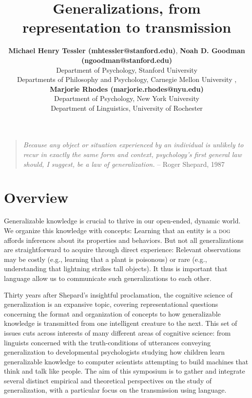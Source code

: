 \documentclass[10pt,letterpaper]{article}
\title{Generalizations, from representation to transmission}
\author{{\large \bf Michael Henry Tessler (mhtessler@stanford.edu)}, {\large \bf Noah D. Goodman (ngoodman@stanford.edu)}  \\
  Department of Psychology, Stanford University \vspace{-0.1cm}
   \AND {\large \bf David Danks (ddanks@cmu.edu)} \\
  Departments of Philosophy and Psychology, Carnegie Mellon University \vspace{-0.1cm}
    \AND{\large \bf Emily Foster-Hanson (emily.fosterhanson@nyu.edu)}, {\large \bf Marjorie Rhodes (marjorie.rhodes@nyu.edu)} \\
  Department of Psychology, New York University \vspace{-0.1cm}
    \AND {\large \bf Gregory Carlson (calrson@ling.rochester.edu)} \\
  Department of Linguistics, University of Rochester \vspace{-0.1cm}
  }
\begin{document}
\maketitle



\begin{quote}
\footnotesize
\emph{Because any object or situation experienced by an individual is unlikely to recur in exactly the same form and context, psychology's first general law should, I suggest, be a law of generalization.}  -- Roger Shepard, 1987
\end{quote}
\section{Overview}

Generalizable knowledge is crucial to thrive in our open-ended, dynamic world. 
We organize this knowledge with concepts: Learning that an entity is a \textsc{dog} affords inferences about its properties and behaviors. 
But not all generalizations are straightforward to acquire through direct experience: Relevant observations may be costly (e.g., learning that a plant is poisonous) or rare (e.g., understanding that lightning strikes tall objects). 
It thus is important that language allow us to communicate such generalizations to each other. 

Thirty years after Shepard's insightful proclamation, the cognitive science of generalization is an expansive topic, covering representational questions concerning the format and organization of concepts to how generalizable knowledge is transmitted from one intelligent creature to the next.
This set of issues cuts across interests of many different areas of cognitive science: from linguists concerned with the truth-conditions of utterances conveying generalization to developmental psychologists studying how children learn generalizable knowledge to computer scientists attempting to build machines that think and talk like people. 
The aim of this symposium is to gather and integrate several distinct empirical and theoretical perspectives on the study of generalization, with a particular focus on the transmission using language.
\end{document}
